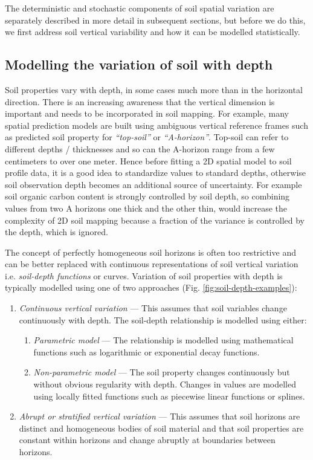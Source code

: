 \documentclass[graybox,natbib,nospthms,UStrade]{svmono}
\begin{document}
The deterministic and stochastic components of soil spatial variation
are separately described in more detail in subsequent sections, but
before we do this, we first address soil vertical variability and how it
can be modelled statistically.

\hypertarget{soil-depth-models}{%
\subsection{Modelling the variation of soil with depth}\label{soil-depth-models}}

Soil properties vary with depth, in some cases much more than in the
horizontal direction. There is an increasing awareness that the vertical
dimension is important and needs to be incorporated in soil mapping. For
example, many spatial prediction models are built using ambiguous
vertical reference frames such as predicted soil property for
\emph{``top-soil''} or \emph{``A-horizon''}. Top-soil can refer to different depths /
thicknesses and so can the A-horizon range from a few centimeters to
over one meter. Hence before fitting a 2D spatial model to soil profile
data, it is a good idea to standardize values to standard depths,
otherwise soil observation depth becomes an additional source of
uncertainty. For example soil organic carbon content is strongly
controlled by soil depth, so combining values from two A horizons one
thick and the other thin, would increase the complexity of 2D soil mapping
because a fraction of the variance is controlled by the depth, which is
ignored.

The concept of perfectly homogeneous soil horizons is often too
restrictive and can be better replaced with continuous representations
of soil vertical variation i.e. \emph{soil-depth functions} or curves.
Variation of soil properties with depth is typically modelled using one
of two approaches (Fig. \ref{fig:soil-depth-examples}):

\begin{enumerate}
\def\labelenumi{\arabic{enumi}.}
\item
  \emph{Continuous vertical variation} --- This assumes that soil variables
  change continuously with depth. The soil-depth relationship is
  modelled using either:

  \begin{enumerate}
  \def\labelenumii{\arabic{enumii}.}
  \item
    \emph{Parametric model} --- The relationship is modelled using
    mathematical functions such as logarithmic or exponential
    decay functions.
  \item
    \emph{Non-parametric model} --- The soil property changes continuously
    but without obvious regularity with depth. Changes in values are
    modelled using locally fitted functions such as piecewise linear
    functions or splines.
  \end{enumerate}
\item
  \emph{Abrupt or stratified vertical variation} --- This assumes that soil
  horizons are distinct and homogeneous bodies of soil material and
  that soil properties are constant within horizons and change
  abruptly at boundaries between horizons.
\end{enumerate}
\end{document}
